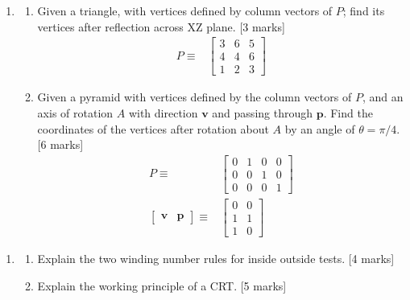 \documentclass[11pt,a4paper,onecolumn]{tiet-question-paper}
\begin{document}
\begin{enumerate}[resume]
\item
  \begin{enumerate}
  \item Given a triangle, with vertices defined by
    column vectors of $P$; find its vertices after
    reflection across XZ plane. \hfill [3 marks]
    \begin{align*}
      P\equiv
      &\begin{bmatrix}
        3&6&5 \\ 4&4&6 \\ 1&2&3
      \end{bmatrix}
    \end{align*}
  \item Given a pyramid with vertices defined by the
    column vectors of $P$, and an axis of rotation $A$
    with direction $\textbf{v}$ and passing through
    $\textbf{p}$.  Find the coordinates of the vertices
    after rotation about $A$ by an angle of
    $\theta=\pi/4$.\hfill [6 marks]
    \begin{align*}
      P\equiv
      &\begin{bmatrix}
        0&1&0&0 \\ 0&0&1&0 \\0&0&0&1
      \end{bmatrix} \\
      \begin{bmatrix}
        \mathbf{v} & \mathbf{p}
      \end{bmatrix}\equiv
      &\begin{bmatrix}
        0&0 \\1&1\\1&0
      \end{bmatrix}
    \end{align*}
  \end{enumerate}
\end{enumerate}
\bvrhrule[0.4pt]
\begin{enumerate}[resume]
\item
  \begin{enumerate}
    \item Explain the two winding number rules for
      inside outside tests. \hfill [4 marks]
    \item Explain the working principle of a
      CRT. \hfill [5 marks]
  \end{enumerate}
\end{enumerate}
\bvrhrule[0.4pt]
\end{document}
